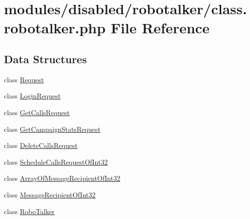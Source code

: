 \hypertarget{class_8robotalker_8php}{\section{modules/disabled/robotalker/class.robotalker.\-php File Reference}
\label{class_8robotalker_8php}
}
\subsection*{Data Structures}
\begin{DoxyCompactItemize}
\item 
class \hyperlink{class_request}{Request}
\item 
class \hyperlink{class_login_request}{Login\-Request}
\item 
class \hyperlink{class_get_calls_request}{Get\-Calls\-Request}
\item 
class \hyperlink{class_get_campaign_stats_request}{Get\-Campaign\-Stats\-Request}
\item 
class \hyperlink{class_delete_calls_request}{Delete\-Calls\-Request}
\item 
class \hyperlink{class_schedule_calls_request_of_int32}{Schedule\-Calls\-Request\-Of\-Int32}
\item 
class \hyperlink{class_array_of_message_recipient_of_int32}{Array\-Of\-Message\-Recipient\-Of\-Int32}
\item 
class \hyperlink{class_message_recipient_of_int32}{Message\-Recipient\-Of\-Int32}
\item 
class \hyperlink{class_robo_talker}{Robo\-Talker}
\end{DoxyCompactItemize}
